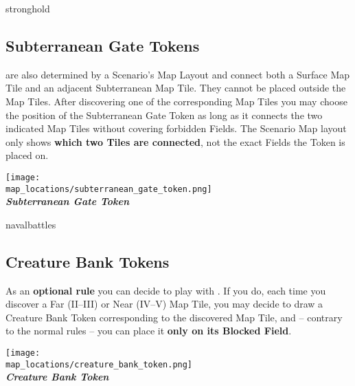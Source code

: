\begin{multicols}{2}
\begin{expansion}[before=\vspace*{-11mm}]{stronghold}
  \subsection*{Subterranean Gate Tokens}
   are also determined by a Scenario's Map Layout and connect both a Surface Map Tile and an adjacent Subterranean Map Tile.
  They cannot be placed outside the Map Tiles.
  After discovering one of the corresponding Map Tiles you may choose the position of the Subterranean Gate Token as long as it connects the two indicated Map Tiles without covering forbidden Fields.
  The Scenario Map layout only shows \textbf{which two Tiles are connected}, not the exact Fields the Token is placed on.
  \bigskip
  \begin{center}
    \texttt{[image: \\map\_locations/subterranean\_gate\_token.png]}\\
    \footnotesize{\textbf{\textit{\textcolor{darkcandyapplered}{Subterranean Gate Token}}}}
  \end{center}
\end{expansion}

\bigskip

\begin{expansion}[before=\vspace*{0pt}]{navalbattles}
  \subsection*{Creature Bank Tokens}
  As an \textbf{optional rule} you can decide to play with .
  If you do, each time you discover a Far \mbox{(II--III)} or Near \mbox{(IV--V)} Map Tile, you may decide to draw a Creature Bank Token corresponding to the discovered Map Tile, and -- contrary to the normal rules -- you can place it \textbf{only on its Blocked Field}.
  \bigskip
  \begin{center}
    \texttt{[image: \\map\_locations/creature\_bank\_token.png]}\\
    \footnotesize{\textbf{\textit{\textcolor{darkcandyapplered}{Creature Bank Token}}}}
  \end{center}
\end{expansion}
\end{multicols}
